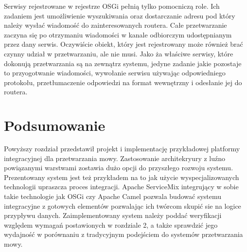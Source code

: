 Serwisy rejestrowane w rejestrze OSGi pełnią tylko pomocniczą role. Ich zadaniem jest umożliwienie wyszukiwania oraz dostarczanie adresu pod który należy wysłać wiadomość do zainteresowanych routera. Całe przetwarzanie zaczyna się po otrzymaniu wiadomości w kanale odbiorczym udostępnianym przez dany serwis. Oczywiście obiekt, który jest rejestrowany może również brać czynny udział w przetwarzaniu, ale nie musi. Jako ża właściwe serwisy, które dokonują przetwarzania są na zewnątrz systemu, jedyne zadanie jakie pozostaje to przyogotwanie wiadomości, wywołanie serwisu używając odpowiedniego protokołu, przetłumaczenie odpowiedzi na format wewnętrzny i odesłanie jej do routera. 



\section*{Podsumowanie} 

Powyższy rozdział przedstawił projekt i implementację przykładowej platformy integracyjnej dla przetwarzania mowy. Zastosowanie architekryury z luźno powiązanymi warstwami zostawia dużo opcji do przyszłego rozwoju systemu. Prezentowany system jest też przykładem na to jak użycie wyspecjalizowanych technologii upraszcza proces integracji. Apache ServiceMix integrujący w sobie takie technologie jak OSGi czy Apache Camel pozwala budować systemu integracyjne z gotowych elementów pozwalając ich twórcom skupić sie na logice przypływu danych. Zaimplementowany system należy poddać weryfikacji względem wymagań postawionych w rozdziale 2, a także sprawdzić jego wydajność w porównaniu z tradycyjnym podejściem do systemów przetwarzania mowy.


















